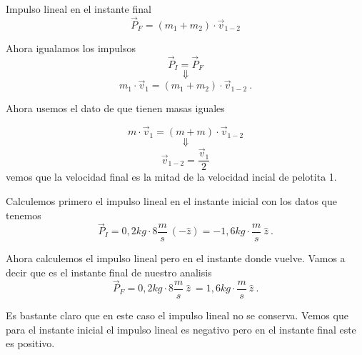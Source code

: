 \documentclass[../Main.tex]{subfiles}
\begin{document}
\begin{minipage}[t]{0.6\textwidth}

Impulso lineal en el instante final
\begin{equation*}
    \vec{P} _F = (m_1 + m_2) \cdot \vec{v} _{1-2}
\end{equation*}

Ahora igualamos los impulsos
\begin{equation*}
 \vec{P} _I = \vec{P} _F
\end{equation*}
\begin{equation*}
    \Downarrow
\end{equation*}
\begin{equation*}
    m_1 \cdot \vec{v} _1 = (m_1 + m_2) \cdot \vec{v} _{1-2} \ .
\end{equation*}

Ahora usemos el dato de que tienen masas iguales

\begin{equation*}
    m \cdot \vec{v} _1 = (m + m) \cdot \vec{v} _{1-2}
\end{equation*}
\begin{equation*}
    \Downarrow
\end{equation*}
\begin{equation*}
    \vec{v} _{1-2} = \frac{\vec{v} _1}{2}
\end{equation*}
vemos que la velocidad final es la mitad de la velocidad incial de pelotita 1.


Calculemos primero el impulso lineal en el instante inicial con los datos que
tenemos
\begin{equation*}
    \vec{P} _{I} = 0,2 kg \cdot 8 \frac{m}{s} \ ( - \hat{z} ) = - 1,6 kg \cdot \frac{m}{s} \ \hat{z} \ .
\end{equation*}

Ahora calculemos el impulso lineal pero en el instante donde vuelve. Vamos a
decir que es el instante final de nuestro analisis
\begin{equation*}
    \vec{P} _{F} = 0,2 kg \cdot 8 \frac{m}{s} \ \hat{z} \ = 1,6 kg \cdot \frac{m}{s} \ \hat{z} \ .
\end{equation*}

Es bastante claro que en este caso el impulso lineal no se conserva. Vemos que
para el instante inicial el impulso lineal es negativo pero en el instante
final este es positivo.

\end{minipage}
\end{document}

